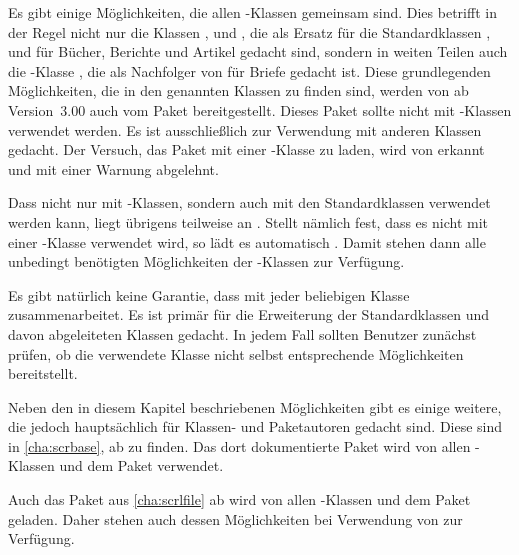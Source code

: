 Es gibt einige Möglichkeiten, die allen \KOMAScript-Klassen gemeinsam
sind. Dies betrifft in der Regel nicht nur die Klassen ,
 und , die als Ersatz für die Standardklassen
,  und  für Bücher, Berichte und
Artikel gedacht sind, sondern in weiten Teilen auch die \KOMAScript-Klasse
, die als Nachfolger von  für Briefe gedacht
ist. Diese grundlegenden Möglichkeiten, die in den genannten Klassen zu finden
sind, werden von \KOMAScript{} ab Version~3.00 auch vom Paket
 bereitgestellt. Dieses Paket sollte
nicht mit \KOMAScript-Klassen verwendet werden. Es ist
ausschließlich zur Verwendung mit anderen Klassen gedacht. Der Versuch, das
Paket mit einer \KOMAScript-Klasse zu laden, wird von 
erkannt und mit einer Warnung abgelehnt.

Dass \hyperref[cha:scrlttr2]{}
nicht nur mit \KOMAScript-Klassen, sondern auch mit den Standardklassen
verwendet werden kann, liegt übrigens teilweise an . Stellt
\hyperref[cha:scrlttr2]{} nämlich fest, dass es nicht mit
einer \KOMAScript-Klasse verwendet wird, so lädt es automatisch
. Damit stehen dann alle unbedingt benötigten Möglichkeiten
der \KOMAScript-Klassen zur Verfügung.

Es gibt natürlich keine Garantie, dass  mit jeder
beliebigen Klasse zusammenarbeitet. Es ist primär für die Erweiterung der
Standardklassen und davon abgeleiteten Klassen gedacht. In jedem Fall sollten
Benutzer zunächst prüfen, ob die verwendete Klasse nicht selbst entsprechende
Möglichkeiten bereitstellt.

Neben den in diesem Kapitel beschriebenen Möglichkeiten gibt es einige
weitere, die jedoch hauptsächlich für Klassen- und Paketautoren gedacht
sind. Diese sind in \autoref{cha:scrbase}, ab  zu
finden. Das dort dokumentierte Paket
\hyperref[cha:scrbase]{}%
wird von allen \KOMAScript-Klassen und dem Paket 
verwendet.

Auch das Paket \hyperref[cha:scrlfile]{}%
aus \autoref{cha:scrlfile} ab  wird von allen
\KOMAScript-Klassen und dem Paket  geladen. Daher stehen
auch dessen Möglichkeiten bei Verwendung von  zur
Verfügung.

